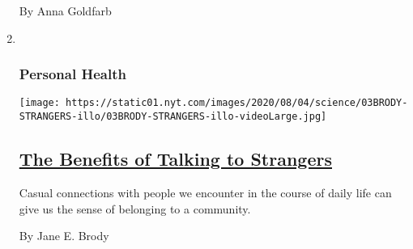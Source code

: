 \begin{enumerate}
  By Anna Goldfarb
\item ~
  \hypertarget{personal-health}{%
  \subsubsection{Personal Health}\label{personal-health}}

  \texttt{[image: https://static01.nyt.com/images/2020/08/04/science/03BRODY-STRANGERS-illo/03BRODY-STRANGERS-illo-videoLarge.jpg]}

  \hypertarget{the-benefits-of-talking-to-strangers}{%
  \subsection{\texorpdfstring{\href{/2020/08/03/well/family/the-benefits-of-talking-to-strangers.html}{The
  Benefits of Talking to
  Strangers}}{The Benefits of Talking to Strangers}}\label{the-benefits-of-talking-to-strangers}}

  Casual connections with people we encounter in the course of daily
  life can give us the sense of belonging to a community.

  By Jane E. Brody
\end{enumerate}

